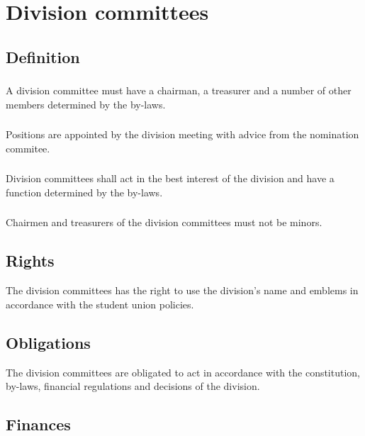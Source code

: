 \documentclass[a4paper]{dtek}
\begin{document}
\newpage

\section{Division committees}
\subsection{Definition}
\subsubsection{}
A division committee must have a chairman, a treasurer and a number of other members determined by the by-laws. 

\subsubsection{}
Positions are appointed by the division meeting with advice from the nomination commitee. 

\subsubsection{}
Division committees shall act in the best interest of the division and have a function determined by the by-laws. 

\subsubsection{}
Chairmen and treasurers of the division committees must not be minors.

\subsection{Rights}
The division committees has the right to use the division's name and emblems in accordance with the student union policies.

\subsection{Obligations}
The division committees are obligated to act in accordance with the constitution, by-laws, financial regulations and decisions of the division. 


\subsection{Finances}
\end{document}

